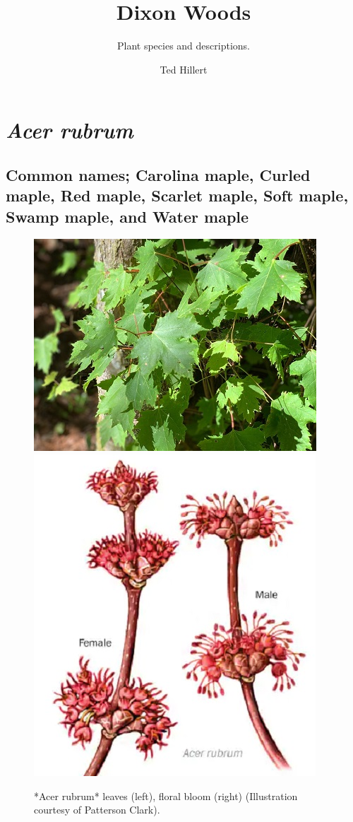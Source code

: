 \documentclass[
]{article}
\title{Dixon Woods}
\subtitle{Plant species and descriptions.}
\author{Ted Hillert}
\date{}
\begin{document}
\maketitle

{
\setcounter{tocdepth}{2}
\tableofcontents
}
\hypertarget{acer-rubrum}{%
\section{\texorpdfstring{\emph{Acer rubrum}}{Acer rubrum}}\label{acer-rubrum}}

\hypertarget{common-names-carolina-maple-curled-maple-red-maple-scarlet-maple-soft-maple-swamp-maple-and-water-maple}{%
\subsection{Common names; Carolina maple, Curled maple, Red maple, Scarlet maple, Soft maple, Swamp maple, and Water maple}\label{common-names-carolina-maple-curled-maple-red-maple-scarlet-maple-soft-maple-swamp-maple-and-water-maple}}

\begin{figure}

{\centering \includegraphics[width=0.5\linewidth]{acer1} \includegraphics[width=0.5\linewidth]{redmap} 

}

\caption{*Acer rubrum* leaves (left), floral bloom (right) (Illustration courtesy of Patterson Clark).}\label{fig:maple}
\end{figure}
\end{document}
